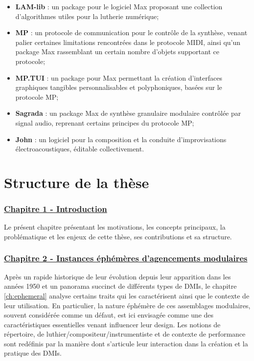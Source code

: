 \begin{itemize}[noitemsep]
\item \textbf{LAM-lib} : un package pour le logiciel Max proposant une collection d'algorithmes utiles pour la lutherie numérique;
\item \textbf{MP} : un protocole de communication pour le contrôle de la synthèse, venant palier certaines limitations rencontrées dans le protocole MIDI, ainsi qu'un package Max rassemblant un certain nombre d'objets supportant ce protocole;
\item \textbf{MP.TUI} : un package pour Max permettant la création d'interfaces graphiques tangibles personnalisables et polyphoniques, basées sur le protocole MP;
\item \textbf{Sagrada} : un package Max de synthèse granulaire modulaire contrôlée par signal audio, reprenant certains principes du protocole MP;
\item \textbf{John} : un logiciel pour la composition et la conduite d'improvisations électroacoustiques, éditable collectivement.
\end{itemize}


\section{Structure de la thèse}
\label{sec:preamble:structure}

\subsubsection*{\hyperref[ch:introduction]{Chapitre 1 - Introduction}} 
\noindent Le présent chapitre présentant les motivations, les concepts principaux, la problématique et les enjeux de cette thèse, ses contributions et sa structure.

\subsubsection*{\hyperref[ch:ephemeral]{Chapitre 2 - Instances éphémères d'agencements modulaires}}

\noindent Après un rapide historique de leur évolution depuis leur apparition dans les années 1950 et un panorama succinct de différents types de \glspl{DMI}, le chapitre \ref{ch:ephemeral} analyse certains traits qui les caractérisent ainsi que le contexte de leur utilisation. En particulier, la nature éphémère de ces assemblages modulaires, souvent considérée comme un défaut, est ici envisagée comme une des caractéristiques essentielles venant influencer leur design. Les notions de répertoire, de luthier/compositeur/instrumentiste et de contexte de performance sont redéfinis par la manière dont s'articule leur interaction dans la création et la pratique des \glspl{DMI}.

